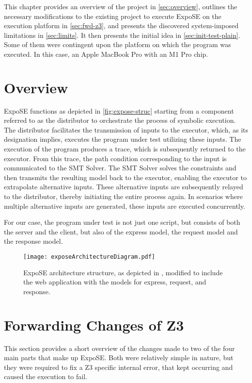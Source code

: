 
This chapter provides an overview of the project in \autoref{sec:overview}, outlines the necessary modifications to the existing project to execute ExpoSE on the execution platform in \autoref{sec:fwd-z3}, and presents the discovered system-imposed limitations in \autoref{sec:limits}. It then presents the initial idea in \autoref{sec:init-test-plain}. Some of them were contingent upon the platform on which the program was executed. In this case, an Apple MacBook Pro with an M1 Pro chip. 

\section{Overview}
\label{sec:overview}


ExpoSE functions as depicted in \autoref{fig:expose-struc} starting from a component referred to as the distributor to orchestrate the process of symbolic execution. The distributor facilitates the transmission of inputs to the executor, which, as its designation implies, executes the program under test utilizing these inputs. The execution of the program produces a trace, which is subsequently returned to the executor. From this trace, the path condition corresponding to the input is communicated to the SMT Solver. The SMT Solver solves the constraints and then transmits the resulting model back to the executor, enabling the executor to extrapolate alternative inputs. These alternative inputs are subsequently relayed to the distributor, thereby initiating the entire process again. In scenarios where multiple alternative inputs are generated, these inputs are executed concurrently.

For our case, the program under test is not just one script, but consists of both the server and the client, but also of the express model, the request model and the response model. 



\begin{figure}
  \centering
\texttt{[image: exposeArchitectureDiagram.pdf]}
 \caption[ExpoSE Architecture]{ExpoSE architecture structure, as depicted in \cite{loring_expose_2017}, modified to include the web application with the models for express, request, and response.}
     \label{fig:expose-struc}
\end{figure}


\FloatBarrier
\section{Forwarding Changes of Z3}
\label{sec:fwd-z3}
This section provides a short overview of the changes made to two of the four main parts that make up ExpoSE. Both were relatively simple in nature, but they were required to fix a Z3 specific internal error, that kept occurring and caused the execution to fail.

